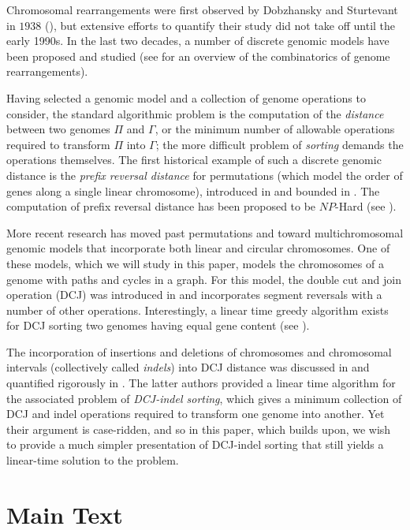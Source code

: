 Chromosomal rearrangements were first observed by Dobzhansky and Sturtevant in $1938$ (\cite{dobzhansky}), but extensive efforts to quantify their study did not take off until the early 1990s.  In the last two decades, a number of discrete genomic models have been proposed and studied (see \cite{fertin2009} for an overview of the combinatorics of genome rearrangements).

Having selected a genomic model and a collection of genome operations to consider, the standard algorithmic problem is the computation of the {\em distance} between two genomes $\Pi$ and $\Gamma$, or the minimum number of allowable operations required to transform $\Pi$ into $\Gamma$; the more difficult problem of {\em sorting} demands the operations themselves.  The first historical example of such a discrete genomic distance is the {\em prefix reversal distance} for permutations (which model the order of genes along a single linear chromosome), introduced in \cite{dweighter} and bounded in \cite{gates, heydari, chitturi}.  The computation of prefix reversal distance has been proposed to be $NP$-Hard (see \cite{bulteau}).

More recent research has moved past permutations and toward multichromosomal genomic models that incorporate both linear and circular chromosomes.  One of these models, which we will study in this paper, models the chromosomes of a genome with paths and cycles in a graph.  For this model, the double cut and join operation (DCJ) was introduced in \cite{yancopoulos} and incorporates segment reversals with a number of other operations.  Interestingly, a linear time greedy algorithm exists for DCJ sorting two genomes having equal gene content (see \cite{bergeron}).

The incorporation of insertions and deletions of chromosomes and chromosomal intervals (collectively called {\em indels}) into DCJ distance was discussed in \cite{yancopoulos2009} and quantified rigorously in \cite{braga2010}.  The latter authors provided a linear time algorithm for the associated problem of {\em DCJ-indel sorting}, which gives a minimum collection of DCJ and indel operations required to transform one genome into another.  Yet their argument is case-ridden, and so in this paper, which builds upon\cite{compeau}, we wish to provide a much simpler presentation of DCJ-indel sorting that still yields a linear-time solution to the problem.


\section*{Main Text}

